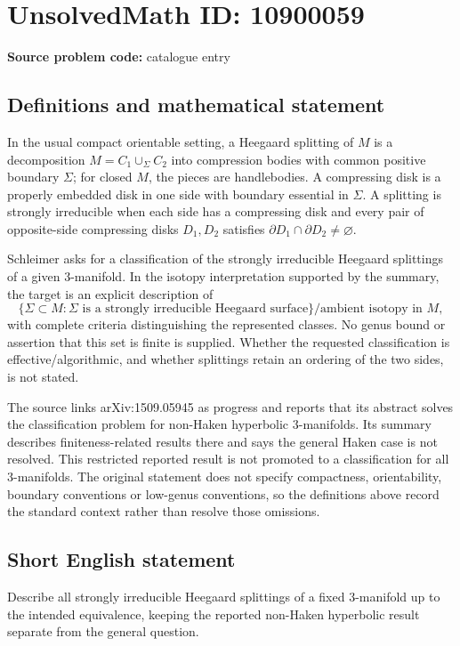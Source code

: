 \documentclass[11pt]{article}
\begin{document}
\section*{UnsolvedMath ID: 10900059}
\textbf{Source problem code:} catalogue entry
\subsection{Definitions and mathematical statement}
In the usual compact orientable setting, a Heegaard splitting of \(M\) is a decomposition \(M=C_1\cup_\Sigma C_2\) into compression bodies with common positive boundary \(\Sigma\); for closed \(M\), the pieces are handlebodies. A compressing disk is a properly embedded disk in one side with boundary essential in \(\Sigma\). A splitting is strongly irreducible when each side has a compressing disk and every pair of opposite-side compressing disks \(D_1,D_2\) satisfies \(\partial D_1\cap\partial D_2\ne\varnothing\).

Schleimer asks for a classification of the strongly irreducible Heegaard splittings of a given \(3\)-manifold. In the isotopy interpretation supported by the summary, the target is an explicit description of
\[
 \{\Sigma\subset M:\Sigma\text{ is a strongly irreducible Heegaard surface}\}
 \big/\text{ambient isotopy in }M,
\]
with complete criteria distinguishing the represented classes. No genus bound or assertion that this set is finite is supplied. Whether the requested classification is effective/algorithmic, and whether splittings retain an ordering of the two sides, is not stated.

The source links arXiv:1509.05945 as progress and reports that its abstract solves the classification problem for non-Haken hyperbolic \(3\)-manifolds. Its summary describes finiteness-related results there and says the general Haken case is not resolved. This restricted reported result is not promoted to a classification for all \(3\)-manifolds. The original statement does not specify compactness, orientability, boundary conventions or low-genus conventions, so the definitions above record the standard context rather than resolve those omissions.
\subsection{Short English statement}
Describe all strongly irreducible Heegaard splittings of a fixed \(3\)-manifold up to the intended equivalence, keeping the reported non-Haken hyperbolic result separate from the general question.
\end{document}
